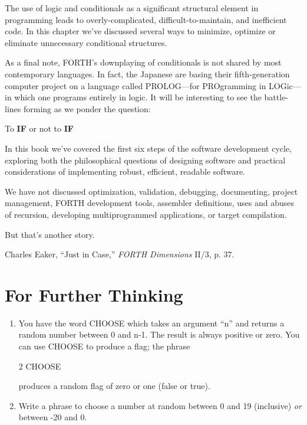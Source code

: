 The use of logic and conditionals as a significant structural element in
programming leads to overly-complicated, difficult-to-maintain, and
inefficient code. In this chapter we've discussed several ways to minimize,
optimize or eliminate unnecessary conditional structures.

As a final note, FORTH's downplaying of conditionals is not shared
by most contemporary languages. In fact, the Japanese are basing their
fifth-generation computer project on a language called PROLOG---for
PROgramming in LOGic---in which one programs entirely in logic. It will
be interesting to see the battle-lines forming as we ponder the question:

To \textbf{IF} or not to \textbf{IF}

In this book we've covered the first six steps of the software development
cycle, exploring both the philosophical questions of designing software
and practical considerations of implementing robust, efficient, readable
software.

We have not discussed optimization, validation, debugging, documenting,
project management, FORTH development tools, assembler
definitions, uses and abuses of recursion, developing multiprogrammed
applications, or target compilation.

But that's another story.

\begin{references}{9}
 Charles Eaker, ``Just in Case,'' \emph{FORTH
Dimensions} II/3, p. 37.
\end{references}

\section{For Further Thinking}

\begin{enumerate}
\item You have the word CHOOSE which takes an argument ``n'' and returns a
random number between 0 and n-1. The result is always positive or zero.
You can use CHOOSE to produce a flag; the phrase
\begin{Code}
2 CHOOSE
\end{Code}
produces a random flag of zero or one (false or true).

\item Write a phrase to choose a number at random between 0 and 19 (inclusive)
\emph{or} between -20 and 0.
\end{enumerate}
